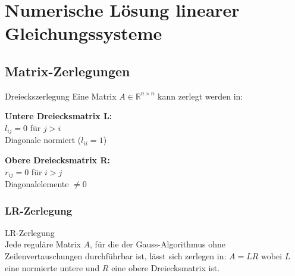 \section{Numerische Lösung linearer Gleichungssysteme}

\subsection{Matrix-Zerlegungen}

\begin{definition}{Dreieckszerlegung}
Eine Matrix $A \in \mathbb{R}^{n\times n}$ kann zerlegt werden in:
\vspace{1mm}\\
\begin{minipage}[t]{0.5\textwidth}
    \textbf{Untere Dreiecksmatrix L:}\\
    $l_{ij} = 0$ für $j > i$\\
    Diagonale normiert ($l_{ii}=1$)
\end{minipage}
\hspace{3mm}
\begin{minipage}[t]{0.45\textwidth}
    \textbf{Obere Dreiecksmatrix R:}\\
    $r_{ij} = 0$ für $i > j$\\
    Diagonalelemente $\neq 0$
\end{minipage}
\end{definition}


\subsubsection{LR-Zerlegung}

\begin{theorem}{LR-Zerlegung}\\
Jede reguläre Matrix $A$, für die der Gauss-Algorithmus ohne Zeilenvertauschungen durchführbar ist, lässt sich zerlegen in:
$A = LR$
wobei $L$ eine normierte untere und $R$ eine obere Dreiecksmatrix ist.
\end{theorem}

